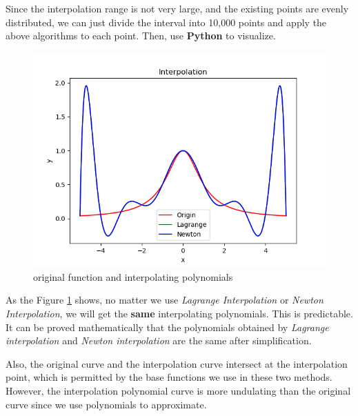 \documentclass[a4paper]{article}
\begin{document}
Since the interpolation range is not very large, and the existing points are evenly distributed, we can just divide the interval into 10,000 points and apply the above algorithms to each point. Then, use \textbf{Python} to visualize.

\begin{figure}[!h]
    \centering
    \includegraphics[width=.6\textwidth]{./figures/Figure_1.png}
    \caption{original function and interpolating polynomials}
    \label{fig:Figure_1}
\end{figure}
As the Figure \ref{fig:Figure_1} shows, no matter we use \emph{Lagrange Interpolation} or \emph{Newton Interpolation}, we will get the \textbf{same} interpolating polynomials.
This is predictable.
It can be proved mathematically that the polynomials obtained by \emph{Lagrange interpolation} and \emph{Newton interpolation} are the same after simplification.

Also, the original curve and the interpolation curve intersect at the interpolation point, which is permitted by the base functions we use in these two methods.
However, the interpolation polynomial curve is more undulating than the original curve since we use polynomials to approximate.
\end{document}
